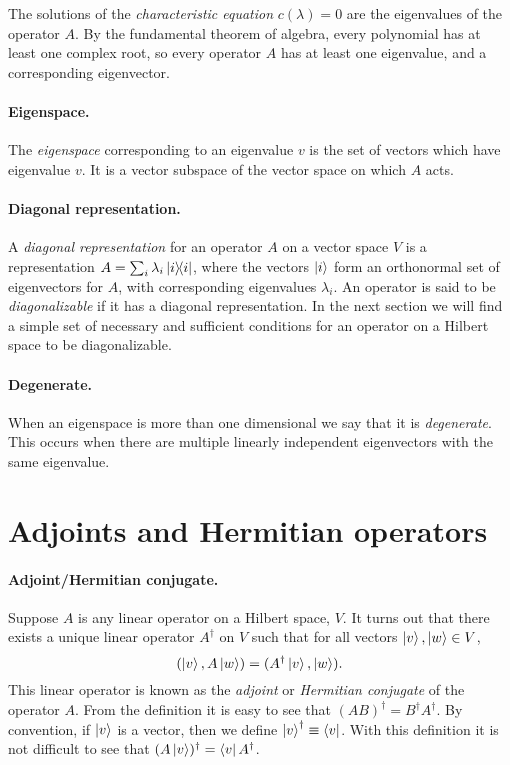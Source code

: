 The solutions of the \emph{characteristic equation} $c(\lambda) = 0$ are the
eigenvalues of the operator $A$. By the fundamental theorem of algebra, every
polynomial has at least one complex root, so every operator $A$ has at least
one eigenvalue, and a corresponding eigenvector.

\paragraph{Eigenspace.} The \emph{eigenspace} corresponding to an eigenvalue
$v$ is the set of vectors which have eigenvalue $v$. It is a vector subspace of
the vector space on which $A$ acts.

\paragraph{Diagonal representation.} A \emph{diagonal representation} for an
operator $A$ on a vector space $V$ is a representation $A = \sum_i \lambda_i
\ketbra{i}{i}$, where the vectors $\ket{i}$ form an orthonormal set of
eigenvectors for $A$, with corresponding eigenvalues $\lambda_i$. An operator
is said to be \emph{diagonalizable} if it has a diagonal representation. In the
next section we will find a simple set of necessary and sufficient conditions
for an operator on a Hilbert space to be diagonalizable.

\paragraph{Degenerate.} When an eigenspace is more than one dimensional we say
that it is \emph{degenerate}. This occurs when there are multiple linearly
independent eigenvectors with the same eigenvalue.

\section{Adjoints and Hermitian operators}

\paragraph{Adjoint/Hermitian conjugate.} Suppose $A$ is any linear operator on
a Hilbert space, $V$. It turns out that there exists a unique linear operator
$A^\dagger$ on $V$ such that for all vectors $\ket{v}, \ket{w} \in V$,
\begin{equation}
  (\ket{v}, A\ket{w}) = (A^\dagger \ket{v}, \ket{w}). \label{eq:adj}
\end{equation}
This linear operator is known as the \emph{adjoint} or \emph{Hermitian
conjugate} of the operator $A$. From the definition it is easy to see that
$(AB)^\dagger = B^\dagger A^\dagger$. By convention, if $\ket{v}$ is a vector,
then we define $\ket{v}^\dagger \equiv \bra{v}$. With this definition it is not
difficult to see that $(A\ket{v})^\dagger = \bra{v}A^\dagger$.

